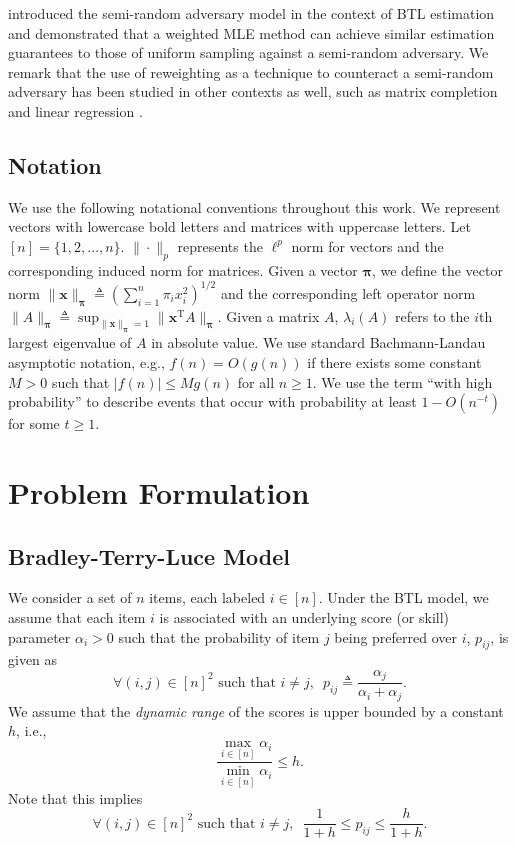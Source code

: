 \documentclass[sigconf,nonacm,pbalance]{acmart}
\newcommand{\tran}{{\mathrm{T}}}
\begin{document}
\cite{MonotoneAdversary} introduced the semi-random adversary model in the context of BTL estimation and demonstrated that a weighted MLE method can achieve similar estimation guarantees to those of uniform sampling against a semi-random adversary. We remark that the use of reweighting as a technique to counteract a semi-random adversary has been studied in other contexts as well, such as matrix completion \cite{ChengGe2018} and linear regression \cite{JambulapatiLiMusco2021}.

\subsection{Notation}
We use the following notational conventions throughout this work. We represent vectors with lowercase bold letters and matrices with uppercase letters. Let $[n]=\{1,2,\dots,n\}$. $\|\cdot \|_p$ represents the $\ell^p$ norm for vectors and the corresponding induced norm for matrices. Given a vector $\bm{\pi}$, we define the vector norm $\|\bm{x}\|_{\bm{\pi}} \triangleq (\sum_{i=1}^n \pi_i x_i^2)^{1/2}$ and the corresponding left operator norm $\|A\|_{\bm{\pi}} \triangleq \sup_{\|\bm{x}\|_{\bm{\pi}}=1} \|\bm{x}^\tran A\|_{\bm{\pi}}$. Given a matrix $A$, $\lambda_i(A)$ refers to the $i$th largest eigenvalue of $A$ in absolute value. We use standard Bachmann-Landau asymptotic notation, e.g., $f(n)=O(g(n))$ if there exists some constant $M>0$ such that $|f(n)| \leq M g(n)$ for all $n \geq 1$. We use the term ``with high probability'' to describe events that occur with probability at least $1-O(n^{-t})$ for some $t\geq 1$.

\section{Problem Formulation}
\subsection{Bradley-Terry-Luce Model}
We consider a set of $n$ items, each labeled $i\in[n]$. Under the BTL model, we assume that each item $i$ is associated with an underlying score (or skill) parameter $\alpha_i>0$ such that the probability of item $j$ being preferred over $i$, $p_{ij}$, is given as
\begin{equation}
    \forall (i, j) \in [n]^2 \text{ such that } i \neq j,\enspace p_{ij} \triangleq \frac{\alpha_j}{\alpha_i+\alpha_j}.
\end{equation}
We assume that the \emph{dynamic range} of the scores is upper bounded by a constant $h$, i.e.,
\begin{equation}
    \frac{\max_{i \in [n]} \alpha_i}{\min_{i \in [n]} \alpha_i} \leq h. \label{eq:dynamic-range}
\end{equation}
Note that this implies
\begin{equation}
    \forall (i, j) \in [n]^2 \text{ such that } i\neq j,\enspace \frac{1}{1+h} \leq p_{ij} \leq \frac{h}{1+h}.
\end{equation}
\end{document}
